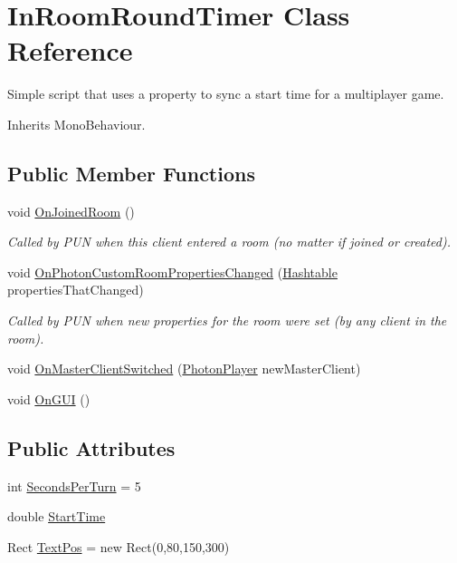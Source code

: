 \hypertarget{class_in_room_round_timer}{}\section{In\+Room\+Round\+Timer Class Reference}
\label{class_in_room_round_timer}


Simple script that uses a property to sync a start time for a multiplayer game.  




Inherits Mono\+Behaviour.

\subsection*{Public Member Functions}
\begin{DoxyCompactItemize}
\item 
void \hyperlink{class_in_room_round_timer_a17202ffb28b9e93f1d2379d79d1e9262}{On\+Joined\+Room} ()
\begin{DoxyCompactList}\small\item\em Called by P\+UN when this client entered a room (no matter if joined or created).\end{DoxyCompactList}\item 
void \hyperlink{class_in_room_round_timer_a226f64a8398f70b91ad6af4ea3b44bd8}{On\+Photon\+Custom\+Room\+Properties\+Changed} (\hyperlink{_extensions_8cs_afa613ef589c02dbd94acc273b62cdcfd}{Hashtable} properties\+That\+Changed)
\begin{DoxyCompactList}\small\item\em Called by P\+UN when new properties for the room were set (by any client in the room).\end{DoxyCompactList}\item 
void \hyperlink{class_in_room_round_timer_ae136a34f3bf637b1b5610fd202ffa1e3}{On\+Master\+Client\+Switched} (\hyperlink{class_photon_player}{Photon\+Player} new\+Master\+Client)
\item 
void \hyperlink{class_in_room_round_timer_a1c1cc2f294b32ed4dd293db35a9f4a7f}{On\+G\+UI} ()
\end{DoxyCompactItemize}
\subsection*{Public Attributes}
\begin{DoxyCompactItemize}
\item 
int \hyperlink{class_in_room_round_timer_a3fbc46448a70dff996a45f508d3e3cc8}{Seconds\+Per\+Turn} = 5
\item 
double \hyperlink{class_in_room_round_timer_a22ba8013f8081643dfffeb95e049a97c}{Start\+Time}
\item 
Rect \hyperlink{class_in_room_round_timer_a1844d64936fc01a304de92179ac0cd4e}{Text\+Pos} = new Rect(0,80,150,300)
\end{DoxyCompactItemize}


